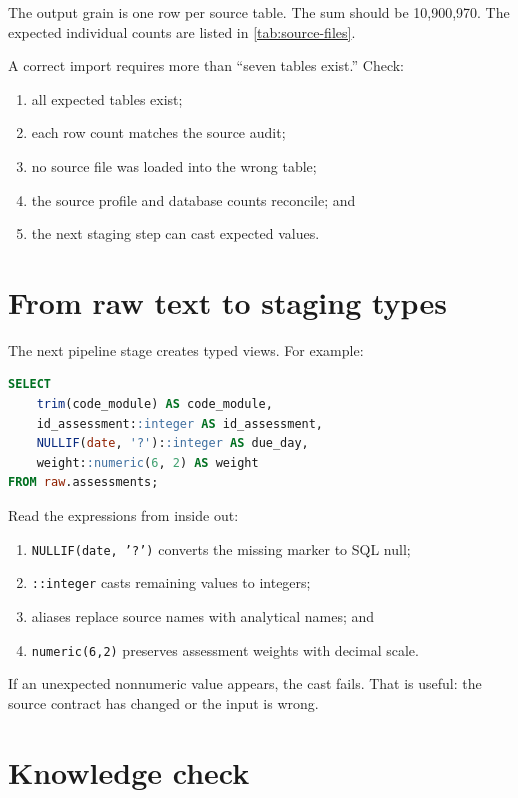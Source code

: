 The output grain is one row per source table. The sum should be 10,900,970.
The expected individual counts are listed in \cref{tab:source-files}.

\begin{validationbox}
A correct import requires more than ``seven tables exist.'' Check:
\begin{enumerate}
  \item all expected tables exist;
  \item each row count matches the source audit;
  \item no source file was loaded into the wrong table;
  \item the source profile and database counts reconcile; and
  \item the next staging step can cast expected values.
\end{enumerate}
\end{validationbox}

\section{From raw text to staging types}

The next pipeline stage creates typed views. For example:

\begin{lstlisting}[language=SQL]
SELECT
    trim(code_module) AS code_module,
    id_assessment::integer AS id_assessment,
    NULLIF(date, '?')::integer AS due_day,
    weight::numeric(6, 2) AS weight
FROM raw.assessments;
\end{lstlisting}

Read the expressions from inside out:
\begin{enumerate}
  \item \texttt{NULLIF(date, '?')} converts the missing marker to SQL null;
  \item \texttt{::integer} casts remaining values to integers;
  \item aliases replace source names with analytical names; and
  \item \texttt{numeric(6,2)} preserves assessment weights with decimal scale.
\end{enumerate}

If an unexpected nonnumeric value appears, the cast fails. That is useful:
the source contract has changed or the input is wrong.

\section{Knowledge check}

